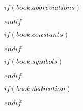 \tableofcontents %

\listoffigures %

\listoftables %

$if(book.abbreviations)$



$endif$

$if(book.constants)$



$endif$

$if(book.symbols)$



$endif$

$if(book.dedication)$

\dedicatory{} 

$endif$


\mainmatter %

\pagestyle{thesis} %

